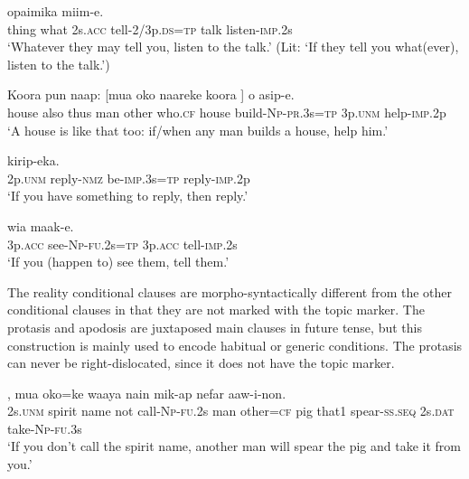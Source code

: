 \ea%
\label{ex:8:x1649}
\gll [Maa  mauwa  nefa  \textstyleEmphasizedVernacularWords{maak-iwkin=na}]  opaimika  miim-e.\\
thing  what 2s.\textsc{acc} tell-2/3p.\textsc{ds}=\textsc{tp} talk  listen-\textsc{imp}.2s\\
\glt`Whatever they may tell you, listen to the talk.' (Lit: `If they tell you what(ever), listen to the talk.')
\z


\ea%
\label{ex:8:x1651}
\gll Koora  pun  naap:  [mua  oko  naareke  koora  ] o  asip-e.\\
house  also  thus  man  other  who.\textsc{cf} house  build-\textsc{Np}-\textsc{pr}.3s=\textsc{tp} 3p.\textsc{unm} help-\textsc{imp}.2p\\
\glt`A house is like that too: if/when any man builds a house, help him.'
\z


\ea%
\label{ex:8:x1656}
\gll [Ni  kirip-owa  \textstyleEmphasizedVernacularWords{ika-inok}=\textstyleEmphasizedVernacularWords{na}] kirip-eka.\\
2p.\textsc{unm} reply-\textsc{nmz} be-\textsc{imp}.3s=\textsc{tp} reply-\textsc{imp}.2p\\
\glt`If you have something to reply, then reply.'
\z


\ea%
\label{ex:8:x1657}
\gll [Wia  \textstyleEmphasizedVernacularWords{uruf-i-nan=na}] wia  maak-e.\\
3p.\textsc{acc} see-\textsc{Np}-\textsc{fu}.2s=\textsc{tp} 3p.\textsc{acc} tell-\textsc{imp}.2s\\
\glt`If you (happen to) see them, tell them.'
\z


The reality conditional clauses are morpho-syntactically different from the other conditional clauses in that they are not marked with the topic marker. The protasis and apodosis are juxtaposed main clauses in future tense, but this construction is mainly used to encode habitual or generic conditions. The protasis can never be right-dislocated, since it does not have the topic marker. 

\ea%
\label{ex:8:x1644}
,  mua  oko=ke  waaya nain  mik-ap  nefar  aaw-i-non.\\
2s.\textsc{unm} spirit  name  not  call-\textsc{Np}-\textsc{fu}.2s man  other=\textsc{cf}  pig that1  spear-\textsc{ss}.\textsc{seq} 2s.\textsc{dat} take-\textsc{Np}-\textsc{fu}.3s\\
\glt`If you don't call the spirit name, another man will spear the pig and take it from you.'
\z


